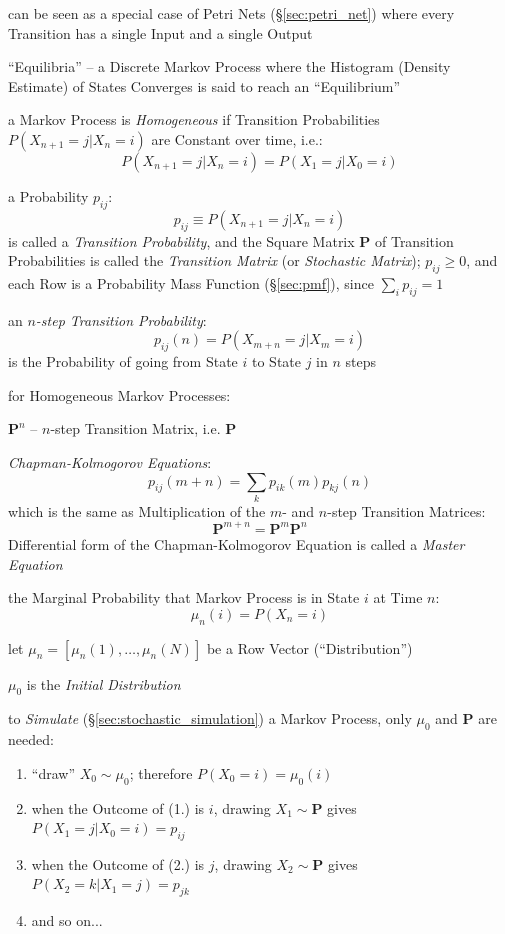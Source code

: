 \fist can be seen as a special case of Petri Nets (\S\ref{sec:petri_net}) where
every Transition has a single Input and a single Output

``Equilibria'' -- a Discrete Markov Process where the Histogram (Density
Estimate) of States Converges is said to reach an ``Equilibrium''

a Markov Process is \emph{Homogeneous} if Transition Probabilities
$P(X_{n+1} = j | X_n = i)$ are Constant over time, i.e.:
\[
  P(X_{n+1} = j | X_n = i) = P(X_1 = j| X_0 = i)
\]

a Probability $p_{ij}$:
\[
  p_{ij} \equiv P(X_{n+1} = j | X_n = i)
\]
is called a \emph{Transition Probability}, and the Square Matrix $\mathbf{P}$ of
Transition Probabilities is called the \emph{Transition Matrix} (or
\emph{Stochastic Matrix});
$p_{ij} \geq 0$, and each Row is a Probability Mass Function (\S\ref{sec:pmf}),
since $\sum_i p_{ij} = 1$

an \emph{$n$-step Transition Probability}:
\[
  p_{ij}(n) = P(X_{m+n} = j | X_m = i)
\]
is the Probability of going from State $i$ to State $j$ in $n$ steps

for Homogeneous Markov Processes:

$\mathbf{P}^n$ -- $n$-step Transition Matrix, i.e. $\mathbf{P}$

\emph{Chapman-Kolmogorov Equations}:
\[
  p_{ij}(m + n) = \sum_k p_{ik}(m) p_{kj}(n)
\]
which is the same as Multiplication of the $m$- and $n$-step Transition
Matrices:
\[
  \mathbf{P}^{m+n} = \mathbf{P}^m \mathbf{P}^n
\]
Differential form of the Chapman-Kolmogorov Equation is called a
\emph{Master Equation}

the Marginal Probability that Markov Process is in State $i$ at Time $n$:
\[
  \mu_n(i) = P(X_n = i)
\]

let $\mu_n = [\mu_n(1), \ldots, \mu_n(N)]$ be a Row Vector (``Distribution'')

$\mu_0$ is the \emph{Initial Distribution}

to \emph{Simulate} (\S\ref{sec:stochastic_simulation}) a Markov Process, only
$\mu_0$ and $\mathbf{P}$ are needed:
\begin{enumerate}
  \item ``draw'' $X_0 \sim \mu_0$; therefore $P(X_0 = i) = \mu_0(i)$
  \item when the Outcome of (1.) is $i$, drawing $X_1 \sim \mathbf{P}$ gives
    $P(X_1 = j | X_0 = i) = p_{ij}$
  \item when the Outcome of (2.) is $j$, drawing $X_2 \sim \mathbf{P}$ gives
    $P(X_2 = k | X_1 = j) = p_{jk}$
  \item and so on...
\end{enumerate}


